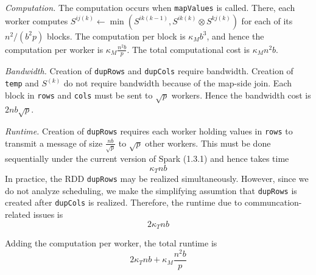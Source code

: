 \documentclass{article} %
\begin{document}
\emph{Computation.}  The computation occurs when {\tt mapValues} is
called.  There, each worker computes $S^{ij(k)} \leftarrow
\min(S^{ik(k-1)}, S^{ik(k)} \otimes S^{kj(k)})$ for each of its
$n^2/(b^2 p)$ blocks.  The computation per block is $\kappa_M b^3$, and
hence the computation per worker is $\kappa_M \frac{n^2b}{p}$.
The total computational cost is $\kappa_M n^2b$.

\emph{Bandwidth.} Creation of {\tt dupRows} and {\tt dupCols} require
bandwidth.  Creation of {\tt temp} and $S^{(k)}$ do not require
bandwidth because of the map-side join.  Each block in {\tt rows} and
{\tt cols} must be sent to $\sqrt{p}$ workers.
Hence the bandwidth cost is $2 n b \sqrt{p}$.

\emph{Runtime.}  Creation of {\tt dupRows} requires each worker
holding values in {\tt rows} to transmit a message of size
$\frac{nb}{\sqrt{p}}$ to $\sqrt{p}$ other workers.  This must be done
sequentially under the current version of Spark (1.3.1) and hence
takes time
\[
\kappa_T nb
\]
In practice, the RDD {\tt dupRows} may be realized simultaneously.
However, since we do not analyze scheduling, we make the simplifying
assumtion that {\tt dupRows} is created after {\tt dupCols} is
realized.
Therefore, the runtime due to communcation-related issues is
\[
2\kappa_T nb
\]

Adding the computation per worker, the total runtime is
\[
2\kappa_T nb + \kappa_M \frac{n^2b}{p}
\]









\end{document}

